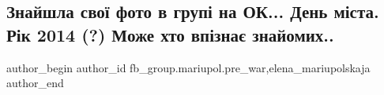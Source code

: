  
 
 
 
 

\subsection{Знайшла свої фото в групі на ОК... День міста. Рік 2014 (?) Може хто впізнає знайомих..}
\label{sec:24_01_2023.fb.fb_group.mariupol.pre_war.1.znaishla_svo__foto_v}
 
\ifcmt
 author_begin
   author_id fb_group.mariupol.pre_war,elena_mariupolskaja
 author_end
\fi
